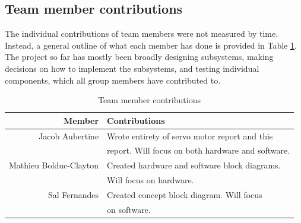 \documentclass{article}
\begin{document}
        \subsection{Team member contributions}
	    The individual contributions of team members were not measured by time. Instead, a general outline of what each member has done is provided in Table \ref{tab:table3}. The project so far has mostly been broadly designing subsystems, making decisions on how to implement the subsystems, and testing individual components, which all group members have contributed to.
	    \begin{table}[!ht]
  	    \begin{center}
            \caption{Team member contributions}
    		\label{tab:table3}
    		\begin{tabular}{r|l}
      			\textbf{Member} & \textbf{Contributions} \\
			    \hline
      			Jacob Aubertine & Wrote entirety of servo motor report and this\\
      			 & report. Will focus on both hardware and software. \\
      			Mathieu Bolduc-Clayton & Created hardware and software block diagrams.\\
      			 & Will focus on hardware.\\
      			Sal Fernandes & Created concept block diagram. Will focus\\
      			 & on software.\\
   			\end{tabular}
  	    \end{center}
	\end{table}

    \newpage
    \nocite{*}
    
    
\end{document}
